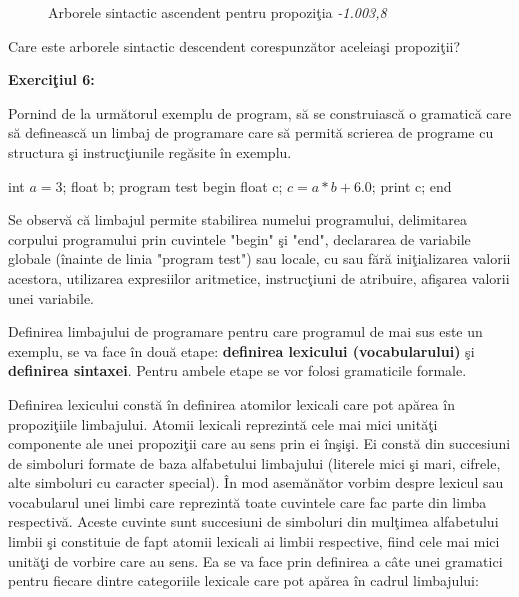 \begin{figure}[H]
\centering
{}
\caption{Arborele sintactic ascendent pentru propoziţia \textit{-1.003,8}}
\end{figure}

Care este arborele sintactic descendent corespunzător aceleiaşi propoziţii?

\textbf{Exerciţiul 6:}

Pornind de la următorul exemplu de program, să se construiască o gramatică care să definească un limbaj de programare care să permită scrierea de programe cu structura şi instrucţiunile regăsite în exemplu.

int $a=3$;		
\newline
float b; 		
\newline
program test	
\newline
begin			
\newline
float c;		
\newline
$c=a*b+6.0$;	
\newline
print c;		
\newline
end				

Se observă că limbajul permite stabilirea numelui programului, delimitarea corpului programului prin cuvintele "begin" şi "end", declararea de variabile globale (înainte de linia "program test") sau locale, cu sau fără iniţializarea valorii acestora, utilizarea expresiilor aritmetice, instrucţiuni de atribuire, afişarea valorii unei variabile.

Definirea limbajului de programare pentru care programul de mai sus este un exemplu, se va face în două etape: \textbf{definirea lexicului (vocabularului)} şi \textbf{definirea sintaxei}. Pentru ambele etape se vor folosi gramaticile formale.

Definirea lexicului constă în definirea atomilor lexicali care pot apărea în propoziţiile limbajului. Atomii lexicali reprezintă cele mai mici unităţi componente ale unei propoziţii care au sens prin ei înşişi. Ei constă din succesiuni de simboluri formate de baza alfabetului limbajului (literele mici şi mari, cifrele, alte simboluri cu caracter special). În mod asemănător vorbim despre lexicul sau vocabularul unei limbi care reprezintă toate cuvintele care fac parte din limba respectivă. Aceste cuvinte sunt succesiuni de simboluri din mulţimea alfabetului limbii şi constituie de fapt atomii lexicali ai limbii respective, fiind cele mai mici unităţi de vorbire care au sens. Ea se va face prin definirea a câte unei gramatici pentru fiecare dintre categoriile lexicale care pot apărea în cadrul limbajului:


